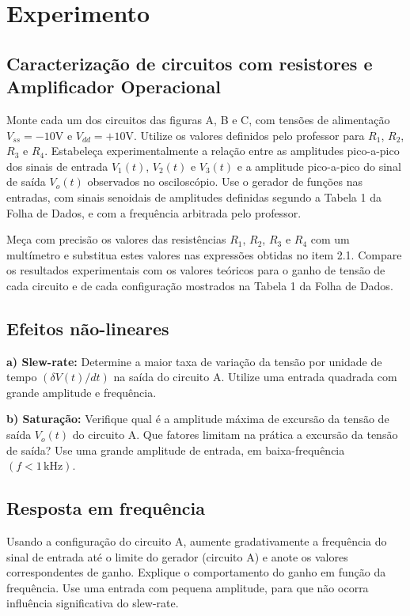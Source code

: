 \section{Experimento}

\subsection{Caracterização de circuitos com resistores e Amplificador
Operacional}

Monte cada um dos circuitos das figuras A, B e C, com tensões de alimentação
$V_{ss}=-10\textrm{V}$ e $V_{dd}=+10\textrm{V}$. Utilize os valores
definidos pelo professor para $R_{1}$, $R_{2}$, $R_{3}$ e $R_{4}$.
Estabeleça experimentalmente a relação entre as amplitudes pico-a-pico
dos sinais de entrada $V_{1}(t)$, $V_{2}(t)$ e $V_{3}(t)$ e a amplitude
pico-a-pico do sinal de saída $V_{o}(t)$ observados no osciloscópio.
Use o gerador de funções nas entradas, com sinais senoidais de amplitudes
definidas segundo a Tabela 1 da Folha de Dados, e com a frequência
arbitrada pelo professor. 

Meça com precisão os valores das resistências $R_{1}$, $R_{2}$,
$R_{3}$ e $R_{4}$ com um multímetro e substitua estes valores nas
expressões obtidas no item 2.1. Compare os resultados experimentais
com os valores teóricos para o ganho de tensão de cada circuito e
de cada configuração mostrados na Tabela 1 da Folha de Dados.

\subsection{Efeitos não-lineares}

\textbf{a) Slew-rate:} Determine a maior taxa de variação da tensão
por unidade de tempo $(\delta V(t)/dt)$ na saída do circuito A. Utilize
uma entrada quadrada com grande amplitude e frequência. 

\noindent\textbf{b) Saturação:} Verifique qual é a amplitude máxima de excursão
da tensão de saída $V_{o}(t)$ do circuito A. Que fatores limitam
na prática a excursão da tensão de saída? Use uma grande amplitude
de entrada, em baixa-frequência $(f<1\,\textrm{kHz})$.

\subsection{Resposta em frequência}

Usando a configuração do circuito A, aumente gradativamente a frequência
do sinal de entrada até o limite do gerador (circuito A) e anote os
valores correspondentes de ganho. Explique o comportamento do ganho
em função da frequência. Use uma entrada com pequena amplitude, para
que não ocorra influência significativa do slew-rate.
